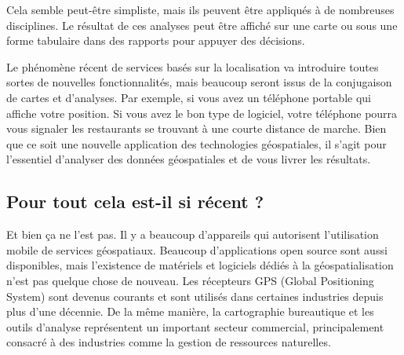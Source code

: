Cela semble peut-être simpliste, mais ils peuvent être appliqués à de nombreuses disciplines. Le résultat de ces analyses peut être affiché sur une carte ou sous une forme tabulaire dans des rapports pour appuyer des décisions.

Le phénomène récent de services basés sur la localisation va introduire toutes sortes de nouvelles fonctionnalités, mais beaucoup seront issus de la conjugaison de cartes et d'analyses. Par exemple, si vous avez un téléphone portable qui affiche votre position. Si vous avez le bon type de logiciel, votre téléphone pourra vous signaler les restaurants se trouvant à une courte distance de marche. Bien que ce soit une nouvelle application des technologies géospatiales, il s'agit pour l'essentiel d'analyser des données géospatiales et de vous livrer les résultats.

	
%
%
%

\subsection{Pour tout cela est-il si récent ?}\label{label_whynew}
Et bien ça ne l'est pas. Il y a beaucoup d'appareils qui autorisent l'utilisation mobile de services géospatiaux. Beaucoup d'applications open source sont aussi disponibles, mais l'existence de matériels et logiciels dédiés à la géospatialisation n'est pas quelque chose de nouveau. Les récepteurs GPS (Global Positioning System) sont devenus courants et sont utilisés dans certaines industries depuis plus d'une décennie. De la même manière, la cartographie bureautique et les outils d'analyse représentent un important secteur commercial, principalement consacré à des industries comme la gestion de ressources naturelles.

